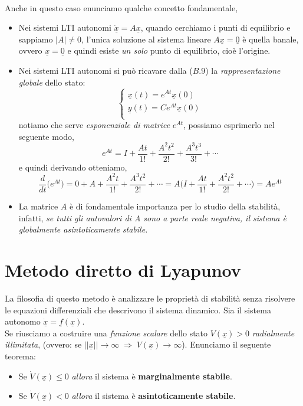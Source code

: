 \paragraph{}
Anche in questo caso enunciamo qualche concetto fondamentale,
\begin{itemize}
	\item Nei sistemi LTI autonomi $\underline{\dot{x}} = A\underline{x}$, quando cerchiamo i punti di equilibrio e sappiamo $\vert A \vert \neq 0$, l'unica soluzione al sistema lineare $A\underline{x} = \underline{0}$ è quella banale, ovvero $\underline{x} = \underline{0}$ e quindi esiste \emph{un solo} punto di equilibrio, cioè l'origine.
	\item Nei sistemi LTI autonomi si può ricavare dalla ($B.9$) la \emph{rappresentazione globale} dello stato:
\begin{equation}
	\begin{cases}
		\underline{x}(t) = e^{At}\underline{x}(0) \\
		\underline{y}(t) = Ce^{At}\underline{x}(0)\\
	\end{cases}
\end{equation}
notiamo che serve \emph{esponenziale di matrice} $e^{At}$, possiamo esprimerlo nel seguente modo,
\begin{equation}
	e^{At} = I + \frac{At}{1!} + \frac{A^2t^2}{2!} + \frac{A^3t^3}{3!} + \cdots
\end{equation}
e quindi derivando otteniamo,
\begin{equation}
	\frac{d}{dt}\Big( e^{At} \Big) = 0 + A + \frac{A^2t}{1!} + \frac{A^3t^2}{2!} + \cdots = A \Big( I + \frac{At}{1!} + \frac{A^2t^2}{2!} + \cdots \Big) = A e^{At}
\end{equation}
	\item La matrice $A$ è di fondamentale importanza per lo studio della stabilità, infatti, \emph{se tutti gli autovalori di A sono a parte reale negativa, il sistema è globalmente asintoticamente stabile.}
\end{itemize}

\section{Metodo diretto di Lyapunov}
La filosofia di questo metodo è analizzare le proprietà di stabilità senza risolvere le equazioni differenziali che descrivono il sistema dinamico. Sia il sistema autonomo $\underline{\dot{x}} = \underline{f}(\underline{x})$.\\ 
Se riusciamo a costruire una \emph{funzione scalare} dello stato $V(\underline{x}) > 0$ \emph{radialmente illimitata}, (ovvero: se $\vert\vert \underline{x} \vert\vert \longrightarrow \infty \; \Rightarrow \; V(\underline{x}) \longrightarrow \infty $). Enunciamo il seguente teorema:
\begin{itemize}
	\item Se $\dot{V}(\underline{x}) \leqslant 0$ \emph{allora} il sistema è \textbf{marginalmente stabile}.
	\item Se $\dot{V}(\underline{x}) < 0$ \emph{allora} il sistema è \textbf{asintoticamente stabile}.
\end{itemize}

